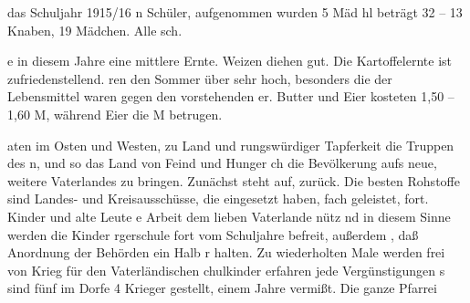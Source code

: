 

das Schuljahr 1915/16\ob
{}%
n Schüler, aufgenommen wurden 5 Mäd\ohb
hl beträgt 32 – 13 Knaben, 19 Mädchen. Alle\ob
sch.

\pend
{}
\pstart

%
e in diesem Jahre eine mittlere Ernte. Weizen\ob
diehen gut. Die Kartoffelernte ist zufriedenstellend.\ob
ren den Sommer über sehr hoch, besonders die\ob
der Lebensmittel waren gegen den vorstehenden\ob
er. Butter und Eier kosteten 1,50 – 1,60 M, während Eier die\ob
M betrugen.

\pend
{}
\pstart

%
aten im Osten und Westen, zu Land und\ob
rungswürdiger Tapferkeit die Truppen des\ob
n, und so das Land von Feind und Hunger\ob
ch die Bevölkerung aufs neue, weitere\ob
 Vaterlandes zu bringen. Zunächst steht auf,\ob
 zurück. Die besten Rohstoffe sind\ob
Landes- und Kreisausschüsse, die eingesetzt haben,\ob
fach geleistet, fort. Kinder und alte Leute\ob
e Arbeit dem lieben Vaterlande nütz\ohb
nd in diesem Sinne werden die Kinder\ob
rgerschule fort vom Schuljahre befreit, außerdem\ob
, daß Anordnung der Behörden ein Halb\ohb
r halten. Zu wiederholten Male werden\ob
 frei von Krieg für den Vaterländischen\ob
chulkinder erfahren jede Vergünstigungen\ob
s sind fünf im Dorfe 4 Krieger gestellt,\ob
 einem Jahre vermißt. Die ganze Pfarrei
\pend
